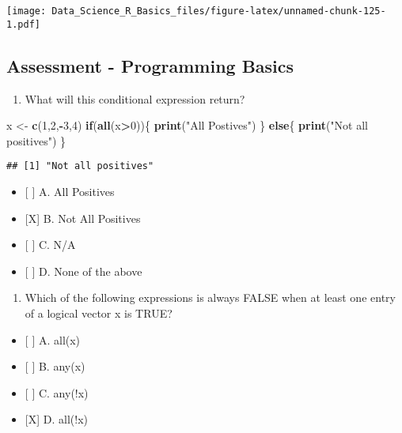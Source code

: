 \documentclass[]{article}
\newenvironment{Shaded}{\begin{snugshade}}{\end{snugshade}}
\newcommand{\ControlFlowTok}[1]{\textcolor[rgb]{0.13,0.29,0.53}{\textbf{#1}}}
\newcommand{\DecValTok}[1]{\textcolor[rgb]{0.00,0.00,0.81}{#1}}
\newcommand{\KeywordTok}[1]{\textcolor[rgb]{0.13,0.29,0.53}{\textbf{#1}}}
\newcommand{\NormalTok}[1]{#1}
\newcommand{\OperatorTok}[1]{\textcolor[rgb]{0.81,0.36,0.00}{\textbf{#1}}}
\newcommand{\StringTok}[1]{\textcolor[rgb]{0.31,0.60,0.02}{#1}}
\providecommand{\tightlist}{%
  \setlength{\itemsep}{0pt}\setlength{\parskip}{0pt}}
\begin{document}
\texttt{[image: Data\_Science\_R\_Basics\_files/figure-latex/unnamed-chunk-125-1.pdf]}

\hypertarget{assessment---programming-basics}{%
\subsection{Assessment - Programming
Basics}\label{assessment---programming-basics}}

\begin{enumerate}
\def\labelenumi{\arabic{enumi}.}
\tightlist
\item
  What will this conditional expression return?
\end{enumerate}

\begin{Shaded}
\begin{Highlighting}[]
\NormalTok{x <-}\StringTok{ }\KeywordTok{c}\NormalTok{(}\DecValTok{1}\NormalTok{,}\DecValTok{2}\NormalTok{,}\OperatorTok{-}\DecValTok{3}\NormalTok{,}\DecValTok{4}\NormalTok{)}
\ControlFlowTok{if}\NormalTok{(}\KeywordTok{all}\NormalTok{(x}\OperatorTok{>}\DecValTok{0}\NormalTok{))\{}
\KeywordTok{print}\NormalTok{(}\StringTok{"All Postives"}\NormalTok{)}
\NormalTok{\} }\ControlFlowTok{else}\NormalTok{\{}
\KeywordTok{print}\NormalTok{(}\StringTok{"Not all positives"}\NormalTok{)}
\NormalTok{\}}
\end{Highlighting}
\end{Shaded}

\begin{verbatim}
## [1] "Not all positives"
\end{verbatim}

\begin{itemize}
\tightlist
\item
  {[} {]} A. All Positives
\item
  {[}X{]} B. Not All Positives
\item
  {[} {]} C. N/A
\item
  {[} {]} D. None of the above
\end{itemize}

\begin{enumerate}
\def\labelenumi{\arabic{enumi}.}
\setcounter{enumi}{1}
\tightlist
\item
  Which of the following expressions is always FALSE when at least one
  entry of a logical vector x is TRUE?
\end{enumerate}

\begin{itemize}
\tightlist
\item
  {[} {]} A. all(x)
\item
  {[} {]} B. any(x)
\item
  {[} {]} C. any(!x)
\item
  {[}X{]} D. all(!x)
\end{itemize}
\end{document}
